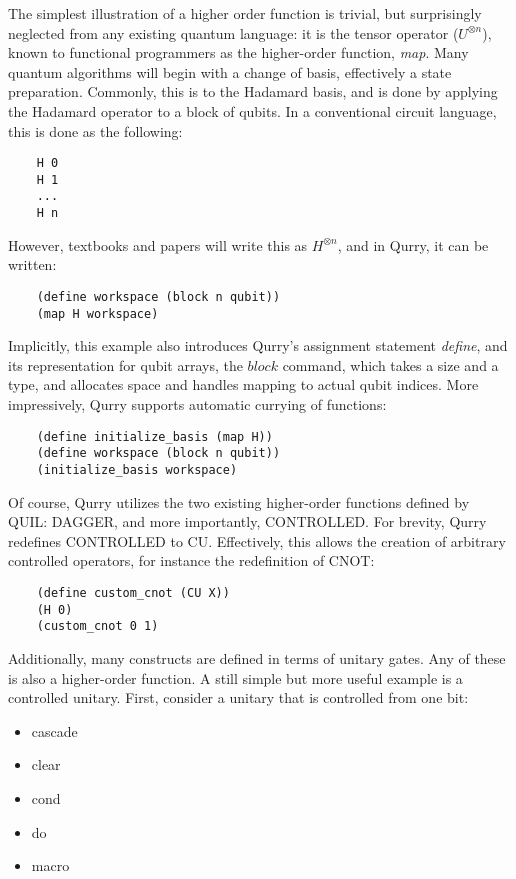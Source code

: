 \documentclass[journal]{article}
\begin{document}
    The simplest illustration of a higher order function is trivial, but surprisingly neglected from any existing quantum language: it is the tensor operator ($U^{\otimes n}$), known to functional programmers as the higher-order function, \emph{map}.
    Many quantum algorithms will begin with a change of basis, effectively a state preparation. 
    Commonly, this is to the Hadamard basis, and is done by applying the Hadamard operator to a block of qubits.
    In a conventional circuit language, this is done as the following:
    \begin{verbatim}
    H 0
    H 1
    ...
    H n\end{verbatim}
    However, textbooks and papers will write this as $H^{\otimes n}$, and in Qurry, it can be written:
    \begin{verbatim}
    (define workspace (block n qubit))
    (map H workspace)\end{verbatim}
    Implicitly, this example also introduces Qurry's assignment statement \emph{define}, and its representation for qubit arrays, the $block$ command, which takes a size and a type, and allocates space and handles mapping to actual qubit indices.
    More impressively, Qurry supports automatic currying of functions:
    \begin{verbatim}
    (define initialize_basis (map H))
    (define workspace (block n qubit))
    (initialize_basis workspace)\end{verbatim}

    Of course, Qurry utilizes the two existing higher-order functions defined by QUIL: DAGGER, and more importantly, CONTROLLED.
    For brevity, Qurry redefines CONTROLLED to CU.
    Effectively, this allows the creation of arbitrary controlled operators, for instance the redefinition of CNOT:
    \begin{verbatim}
    (define custom_cnot (CU X))
    (H 0)
    (custom_cnot 0 1)
    \end{verbatim}



    Additionally, many constructs are defined in terms of unitary gates. Any of these is also a higher-order function.
    A still simple but more useful example is a controlled unitary.
    First, consider a unitary that is controlled from one bit:


    \begin{itemize}
        \item cascade 	    
        \item clear 	    
        \item cond 	    
        \item do 	        
        \item macro 	    
    \end{itemize}
\end{document}
